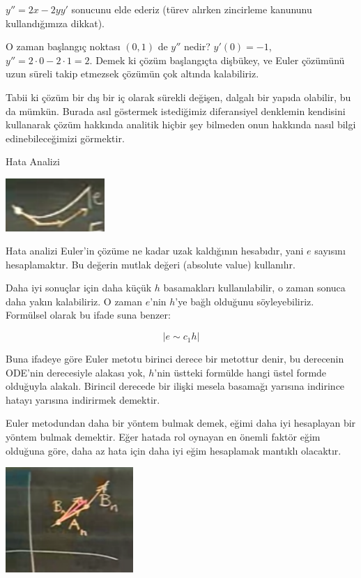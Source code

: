 \documentclass[12pt,fleqn]{article}\usepackage{../../common}
\begin{document}
$y'' = 2x - 2yy'$ sonucunu elde ederiz (türev alırken zincirleme kanununu
kullandığımıza dikkat).

O zaman başlangıç noktası $(0,1)$ de $y''$ nedir? $y'(0) = -1$, $y''= 2 \cdot 0
- 2\cdot 1 = 2$. Demek ki çözüm başlangıçta dişbükey, ve Euler çözümünü
uzun süreli takip etmezsek çözümün çok altında kalabiliriz. 

Tabii ki çözüm bir dış bir iç olarak sürekli değişen, dalgalı bir yapıda
olabilir, bu da mümkün. Burada asıl göstermek istediğimiz diferansiyel denklemin
kendisini kullanarak çözüm hakkında analitik hiçbir şey bilmeden onun hakkında
nasıl bilgi edinebileceğimizi görmektir. 

Hata Analizi

\includegraphics[height=2cm]{2_3.png}

Hata analizi Euler'in çözüme ne kadar uzak kaldığının hesabıdır, yani $e$
sayısını hesaplamaktır. Bu değerin mutlak değeri (absolute value) kullanılır. 

Daha iyi sonuçlar için daha küçük $h$ basamakları kullanılabilir, o zaman sonuca
daha yakın kalabiliriz. O zaman $e$'nin $h$'ye bağlı olduğunu
söyleyebiliriz. Formülsel olarak bu ifade suna benzer:

$$ |e \sim c_1 h| $$

Buna ifadeye göre Euler metotu birinci derece bir metottur denir, bu derecenin
ODE'nin derecesiyle alakası yok, $h$'nin üstteki formülde hangi üstel formde
olduğuyla alakalı. Birincil derecede bir ilişki mesela basamağı yarısına
indirince hatayı yarısına indirirmek demektir.

Euler metodundan daha bir yöntem bulmak demek, eğimi daha iyi hesaplayan bir
yöntem bulmak demektir. Eğer hatada rol oynayan en önemli faktör eğim olduğuna
göre, daha az hata için daha iyi eğim hesaplamak mantıklı olacaktır. 

\includegraphics[height=4cm]{2_4.png}
\end{document}
